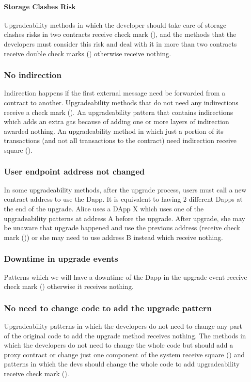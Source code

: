 \paragraph{Storage Clashes Risk}
Upgradeability methods in which the developer should take care of storage clashes risks in two contracts receive check mark (\checkmark), and the methods that the developers must consider this risk and deal with it in more than two contracts receive double check marks (\checkmark\checkmark) otherwise receive nothing. 

 \subsubsection{No indirection}  
 Indirection happens if the first external message need be forwarded from a contract to another. Upgradeability methods that do not need any indirections receive a check mark (\checkmark). An upgradeability pattern that contains indirections which adds an extra gas because of adding one or more layers of indirection awarded nothing. An upgradeability method in which just a portion of its transactions (and not all transactions to the contract) need indirection receive square (\XBox). 

\subsubsection{User endpoint address not changed}
In some upgradeability methods, after the upgrade process, users must call a new contract address to use the Dapp. It is equivalent to having 2 different Dapps at the  end of the upgrade. Alice uses a DApp X which uses one of the upgradeability patterns at address A before the upgrade. After upgrade, she may be unaware that upgrade happened and use the previous address (receive check mark (\checkmark)) or she may need to use address B instead which receive nothing.


\subsubsection{Downtime in upgrade events}
Patterns which we will have a downtime of the Dapp in the upgrade event receive check mark (\checkmark) otherwise it receives nothing. 


\subsubsection{No need to change code to add the upgrade pattern}
Upgradeability patterns in which the developers do not need to change any part of the original code to add the upgrade method receives nothing. The methods in which the developers do not need to change the whole code but should add a proxy contract or change just one component of the system receive square (\XBox) and patterns in which the devs should change the whole code to add upgradeability receive check mark (\checkmark).

